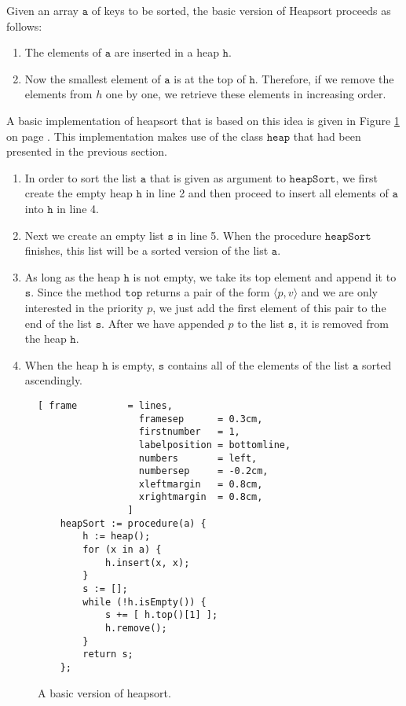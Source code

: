 Given an array $\mathtt{a}$ of keys to be sorted, the basic version of Heapsort proceeds as follows:
\begin{enumerate}
\item The elements of $\mathtt{a}$ are inserted in a heap $\mathtt{h}$.
\item Now the smallest element of $\mathtt{a}$ is at the top of $\mathtt{h}$.  Therefore, if we remove the elements
      from $h$ one by one, we retrieve these elements in increasing order.
\end{enumerate}
A basic implementation of heapsort that is based on this idea is given in Figure
\ref{fig:basic-heapsort.stlx} on page \pageref{fig:basic-heapsort.stlx}.  This implementation makes
use of the class $\mathtt{heap}$ that had been presented in the previous section.
\begin{enumerate}
\item In order to sort the list $\mathtt{a}$ that is given as argument to $\mathtt{heapSort}$, we first
      create the empty heap 
      $\mathtt{h}$ in line 2 and then proceed to insert all elements of $\mathtt{a}$ into $\mathtt{h}$ 
      in line 4.
\item Next we create an empty list $\mathtt{s}$ in line 5. When the procedure $\mathtt{heapSort}$
      finishes, this list will be a sorted version of the list $\mathtt{a}$.
\item As long as the heap $\mathtt{h}$ is not empty, we take its top element and append it to
      $\mathtt{s}$.  Since the method $\mathtt{top}$ returns a pair of the form $\langle p, v\rangle$ and
      we are only interested in the priority $p$, we just add the first element of this pair to the
      end of the list $\mathtt{s}$.  After we have appended $p$ to the list $\mathtt{s}$, it is removed
      from the heap $\mathtt{h}$.
\item When the heap $\mathtt{h}$ is empty, $\mathtt{s}$ contains all of the elements of the list $\mathtt{a}$
      sorted ascendingly.
\end{enumerate}

\begin{figure}[!ht]
\centering
\begin{Verbatim}[ frame         = lines, 
                  framesep      = 0.3cm, 
                  firstnumber   = 1,
                  labelposition = bottomline,
                  numbers       = left,
                  numbersep     = -0.2cm,
                  xleftmargin   = 0.8cm,
                  xrightmargin  = 0.8cm,
                ]
    heapSort := procedure(a) {
        h := heap();    
        for (x in a) {
            h.insert(x, x);
        }
        s := [];
        while (!h.isEmpty()) {
            s += [ h.top()[1] ];
            h.remove();
        }
        return s;
    };
\end{Verbatim}
\vspace*{-0.3cm}
\caption{A basic version of heapsort.}
\label{fig:basic-heapsort.stlx}
\end{figure}

